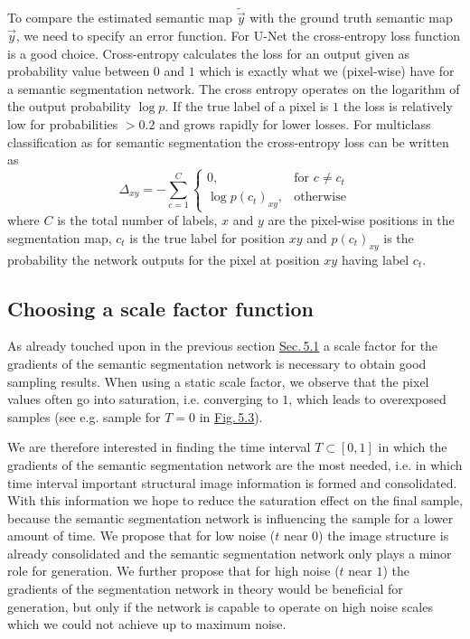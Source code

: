 To compare the estimated semantic map $\tilde{\vec{y}}$ with the ground truth semantic map $\vec{y}$, we need to specify an error function. For U-Net the cross-entropy loss function is a good choice. Cross-entropy calculates the loss for an output given as probability value between $0$ and $1$ which is exactly what we (pixel-wise) have for a semantic segmentation network. The cross entropy operates on the logarithm of the output probability $\log p$. If the true label of a pixel is $1$ the loss is relatively low for probabilities $>0.2$ and grows rapidly for lower losses. For multiclass classification as for semantic segmentation the cross-entropy loss can be written as
%
\begin{equation}
    \Delta_{xy}=-\sum_{c=1}^C 
    \begin{cases}
        0, &\text{for } c\neq c_t\\
        \log p(c_t)_{xy}, &\text{otherwise}
    \end{cases}
\end{equation}
%
where $C$ is the total number of labels, $x$ and $y$ are the pixel-wise positions in the segmentation map, $c_t$ is the true label for position $xy$ and $p(c_t)_{xy}$ is the probability the network outputs for the pixel at position $xy$ having label $c_t$.
%
\subsection{Choosing a scale factor function} \label{sec:5.2.5}
As already touched upon in the previous section \hyperref[sec:5.1]{Sec.\,5.1} a scale factor for the gradients of the semantic segmentation network is necessary to obtain good sampling results. When using a static scale factor, we observe that the pixel values often go into saturation, i.e. converging to $1$, which leads to overexposed samples (see e.g. sample for $T=0$ in \hyperref[fig:5.3]{Fig.\,5.3}). 

We are therefore interested in finding the time interval $T\subset[0,1]$ in which the gradients of the semantic segmentation network are the most needed, i.e. in which time interval important structural image information is formed and consolidated. With this information we hope to reduce the saturation effect on the final sample, because the semantic segmentation network is influencing the sample for a lower amount of time. We propose that for low noise ($t$ near $0$) the image structure is already consolidated and the semantic segmentation network only plays a minor role for generation. We further propose that for high noise ($t$ near $1$) the gradients of the segmentation network in theory would be beneficial for generation, but only if the network is capable to operate on high noise scales which we could not achieve up to maximum noise.

